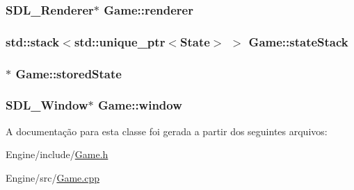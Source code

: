 \hypertarget{classGame_ae5164c37c0dc74cfb56041174017bf57}{
\subsubsection[{renderer}]{\setlength{\rightskip}{0pt plus 5cm}S\+D\+L\+\_\+\+Renderer$\ast$ Game\+::renderer\hspace{0.3cm}{\ttfamily [private]}}}\label{classGame_ae5164c37c0dc74cfb56041174017bf57}
\hypertarget{classGame_a2706caaad0c60784a6671efc9ee147f8}{
\subsubsection[{state\+Stack}]{\setlength{\rightskip}{0pt plus 5cm}std\+::stack$<$std\+::unique\+\_\+ptr$<${\bf State}$>$ $>$ Game\+::state\+Stack\hspace{0.3cm}{\ttfamily [private]}}}\label{classGame_a2706caaad0c60784a6671efc9ee147f8}
\hypertarget{classGame_a46a38cae75b6557890d7c47ad8350a1d}{
\subsubsection[{stored\+State}]{$\ast$ Game\+::stored\+State\hspace{0.3cm}{\ttfamily [private]}}}\label{classGame_a46a38cae75b6557890d7c47ad8350a1d}
\hypertarget{classGame_adc376cc3011b5c8f1c3897626100174c}{
\subsubsection[{window}]{\setlength{\rightskip}{0pt plus 5cm}S\+D\+L\+\_\+\+Window$\ast$ Game\+::window\hspace{0.3cm}{\ttfamily [private]}}}\label{classGame_adc376cc3011b5c8f1c3897626100174c}


A documentação para esta classe foi gerada a partir dos seguintes arquivos\+:\begin{DoxyCompactItemize}
\item 
Engine/include/\hyperlink{Game_8h}{Game.\+h}\item 
Engine/src/\hyperlink{Game_8cpp}{Game.\+cpp}\end{DoxyCompactItemize}
